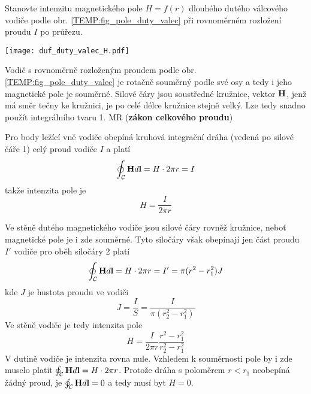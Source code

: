 \begin{example}
  Stanovte intenzitu magnetického pole $H=f(r)$ dlouhého dutého válcového vodiče podle obr.
  \ref{TEMP:fig_pole_duty_valec} při rovnoměrném rozložení proudu $I$ po průřezu. 
  
   {\centering
    \captionsetup{type=figure}
    \texttt{[image: duf\_duty\_valec\_H.pdf]}
    \label{TEMP:fig_pole_duty_valec}
  \par}
  
  Vodič s rovnoměrně rozloženým proudem podle obr. \ref{TEMP:fig_pole_duty_valec} je rotačně
  souměrný podle své osy a tedy i jeho magnetické pole je souměrné. Silové čáry jsou soustředné
  kružnice, vektor $\mathbf{H}$, jenž má směr tečny ke kružnici, je po celé délce kružnice stejně
  velký. Lze tedy snadno použít integrálního tvaru 1. MR (\textbf{zákon celkového proudu})
  
  Pro body ležící vně vodiče obepíná kruhová integrační dráha (vedená po silové čáře 1) celý
  proud vodiče $I$ a platí
  \begin{equation}\label{TEMP:eq_1MR_duty_valec}
    \oint_\mathcal{C}\mathbf{H}d\mathbf{l} = H\cdot 2\pi r = I
  \end{equation}
  takže intenzita pole je
  \begin{equation}\label{TEMP:eq_H_duty_valec}
    H = \frac{I}{2\pi r}
  \end{equation}
  
  Ve stěně dutého magnetického vodiče jsou silové čáry rovněž kružnice, neboť magnetické pole
  je i zde souměrné. Tyto siločáry však obepínají jen část proudu $I'$ vodiče pro oběh siločáry
  2 platí
  \begin{equation}\label{TEMP:eq_1MR_uvnitr_valce}
    \oint_\mathcal{C}\mathbf{H}d\mathbf{l} = H\cdot 2\pi r = I' = \pi(r^2-r_1^2)J
  \end{equation}
  kde $J$ je hustota proudu ve vodiči
  \begin{equation}\label{TEMP:eq_J_duty_valec}
    J = \frac{I}{S}= \frac{I}{\pi(r_2^2-r_1^2)}
  \end{equation}
  Ve stěně vodiče je tedy intenzita pole
  \begin{equation}\label{TEMP:eq_H_uvnitr_valce}
    H = \frac{I}{2\pi r}\frac{r^2-r_1^2}{r_2^2-r_1^2}
  \end{equation}
  V dutině vodiče je intenzita rovna nule. Vzhledem k souměrnosti pole by i zde muselo platit
  $\oint_\mathcal{C}\mathbf{H}d\mathbf{l} = H\cdot 2\pi r$. Protože dráha s poloměrem $r<r_1$ neobepíná
  žádný proud, je $\oint_\mathcal{C}\mathbf{H}d\mathbf{l} = 0$ a tedy musí byt $H = 0$.
\end{example}    
